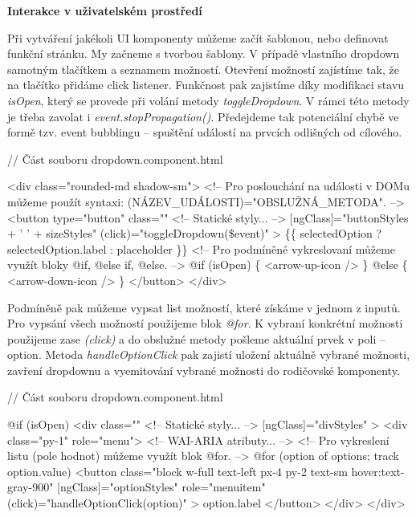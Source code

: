 \begin{flushleft}
  \textbf{Interakce v uživatelském prostředí}
\end{flushleft}

Při vytváření jakékoli UI komponenty můžeme začít šablonou, nebo definovat funkční stránku. My začneme s tvorbou šablony. V případě vlastního dropdown samotným tlačítkem a seznamem možností. 
Otevření možností zajístíme tak, že na tlačítko přidáme click listener. Funkčnost pak zajistíme díky modifikaci stavu \emph{isOpen}, který se provede při volání metody \emph{toggleDropdown}. 
V rámci této metody je třeba zavolat i \emph{event.stopPropagation()}. Předejdeme tak potenciální chybě ve formě tzv. event bubblingu -- spuštění událostí na prvcích odlišných od cílového.

\begin{prog}
// Část souboru dropdown.component.html

<div class="rounded-md shadow-sm">
  <!-- Pro poslouchání na události v DOMu můžeme 
    použít syntaxi: (NÁZEV_UDÁLOSTI)="OBSLUŽNÁ_METODA". -->
  <button
    type="button"
    class="" <!-- Statické styly... -->
    [ngClass]="buttonStyles + ' ' + sizeStyles"
    (click)="toggleDropdown(\$event)"
  >
    \{\{ selectedOption ? selectedOption.label : placeholder \}\}
    <!-- Pro podmíněné vykreslovaní můžeme využít bloky @if, @else if, @else. -->
    @if (isOpen) \{
      <arrow-up-icon />
    \} @else \{
      <arrow-down-icon />
    \}
  </button>
</div>
\end{prog}

Podmíněně pak můžeme vypsat list možností, které získáme v jednom z inputů. Pro vypsání všech možností použijeme blok \emph{@for}. 
K vybraní konkrétní možnosti použijeme zase \emph{(click)} a do obslužné metody pošleme aktuální prvek v poli -- option. 
Metoda \emph{handleOptionClick} pak zajistí uložení aktuálně vybrané možnosti, zavření dropdownu a vyemitování vybrané možnosti do rodičovské komponenty.

\begin{prog}
// Část souboru dropdown.component.html

@if (isOpen) {
  <div
    class="" <!-- Statické styly... -->
    [ngClass]="divStyles"
  >
    <div class="py-1" role="menu"> <!-- WAI-ARIA atributy... -->
      <!-- Pro vykreslení listu (pole hodnot) můžeme využít blok @for. -->
      @for (option of options; track option.value) {
        <button
          class="block w-full text-left px-4 py-2 text-sm hover:text-gray-900"
          [ngClass]="optionStyles"
          role="menuitem"
          (click)="handleOptionClick(option)"
        >
          {{ option.label }}
        </button>
      }
    </div>
  </div>
}
\end{prog}

